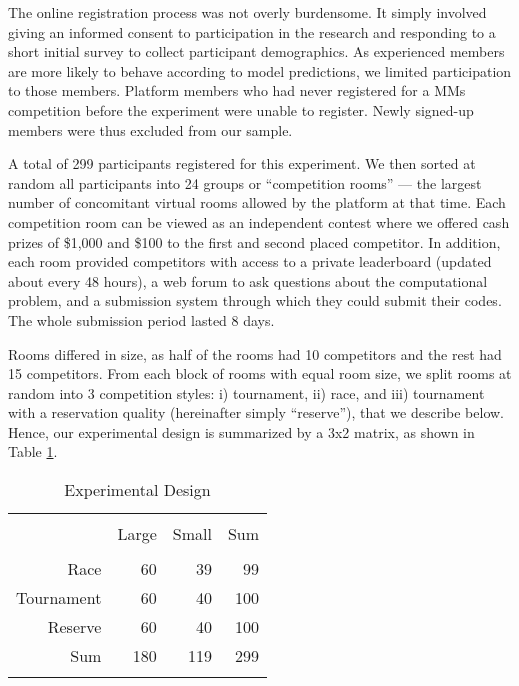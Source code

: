\documentclass[10pt, titlepage]{article}
\begin{document}
The online registration process was not overly burdensome. It simply
involved giving an informed consent to participation in the research and
responding to a short initial survey to collect participant
demographics. As experienced members are more likely to behave according
to model predictions, we limited participation to those members.
Platform members who had never registered for a MMs competition before
the experiment were unable to register. Newly signed-up members were
thus excluded from our sample.

A total of 299 participants registered for this experiment. We then
sorted at random all participants into 24 groups or ``competition
rooms'' --- the largest number of concomitant virtual rooms allowed by
the platform at that time. Each competition room can be viewed as an
independent contest where we offered cash prizes of \$1,000 and \$100 to
the first and second placed competitor. In addition, each room provided
competitors with access to a private leaderboard (updated about every 48
hours), a web forum to ask questions about the computational problem,
and a submission system through which they could submit their codes. The
whole submission period lasted 8 days.

Rooms differed in size, as half of the rooms had 10 competitors and the
rest had 15 competitors. From each block of rooms with equal room size,
we split rooms at random into 3 competition styles: i) tournament, ii)
race, and iii) tournament with a reservation quality (hereinafter simply
``reserve''), that we describe below. Hence, our experimental design is
summarized by a 3x2 matrix, as shown in Table \ref{experimental design}.

\begin{table}
\centering
\caption{Experimental Design}
\label{experimental design}
\begin{tabular}{rrrr}
  \\[-1.8ex]\hline\hline\\[-1.8ex]
 & Large & Small & Sum \\ 
  \hline\\[-1.86ex]
Race & 60 & 39 & 99 \\ 
  Tournament & 60 & 40 & 100 \\ 
  Reserve & 60 & 40 & 100 \\ 
  Sum & 180 & 119 & 299 \\ 
   \hline\\[-1.8ex]
\end{tabular}
\end{table}
\end{document}
